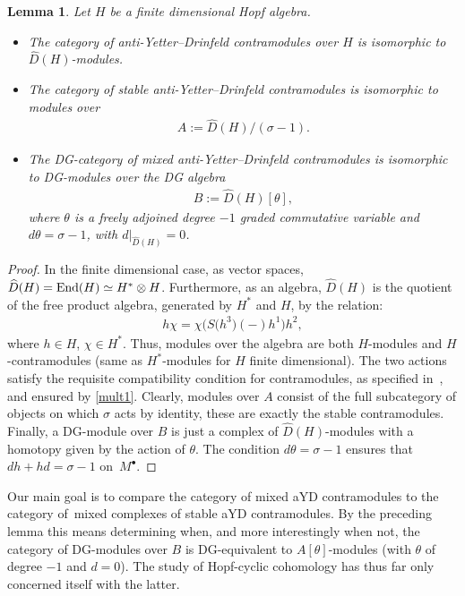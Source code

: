 \documentclass[pdftex]{sigma}
\numberwithin{equation}{section}
\newtheorem{Lemma}[Theorem]{Lemma}
\newcommand{\ot}{\otimes}
\begin{document}
\begin{Lemma}\label{bas}
Let $H$ be a finite dimensional Hopf algebra.
\begin{itemize}\itemsep=0pt
\item The category of anti-Yetter--Drinfeld contramodules over $H$ is isomorphic to $\widehat{D}(H)$-mo\-dules.

\item The category of stable anti-Yetter--Drinfeld contramodules is isomorphic to modules over
\begin{gather}
A:=\widehat{D}(H)/(\sigma-1).
\end{gather}

\item The DG-category of mixed anti-Yetter--Drinfeld contramodules is isomorphic to DG-mo\-dules over the DG algebra
\begin{gather}
B:=\widehat{D}(H)[\theta],
\end{gather}
where $\theta$ is a freely adjoined degree $-1$ graded commutative variable and $d\theta=\sigma-1$, with $d|_{\widehat{D}(H)}=0$.
\end{itemize}
\end{Lemma}
\begin{proof}
In the finite dimensional case, as vector spaces, $\widehat{D}(H)={\rm End}(H)\simeq H^*\ot H$. Furthermore, as an algebra, $\widehat{D}(H)$ is the quotient of the free product algebra, generated by $H^*$ and $H$, by the relation:
\begin{gather}
\label{mult1}
h \chi= \chi\big(S\big(h^3\big)(-)h^1\big)h^2,
\end{gather}
where $h\in H$, $\chi\in H^*$. Thus, modules over the algebra are both $H$-modules and $H$-cont\-ra\-mo\-du\-les (same as $H^*$-modules for $H$ finite dimensional). The two actions satisfy the requisite compatibility condition for contramodules, as specified in~\cite{contra}, and ensured by \eqref{mult1}. Clearly, modules over $A$ consist of the full subcategory of objects on which $\sigma$ acts by identity, these are exactly the stable contramodules. Finally, a DG-module over $B$ is just a complex of $\widehat{D}(H)$-modules with a homotopy given by the action of $\theta$. The condition $d\theta=\sigma-1$ ensures that $dh+hd=\sigma-1$ on~$M^\bullet$.
\end{proof}

Our main goal is to compare the category of mixed
aYD contramodules to the category of~mixed complexes of stable aYD
contramodules. By the preceding lemma this means determining when,
and more interestingly when not, the category of DG-modules over $B$ is DG-equivalent to $A[\theta]$-modules (with $\theta$ of degree $-1$ and $d=0$). The study of Hopf-cyclic cohomology has thus far only concerned itself with the latter.
\end{document}
